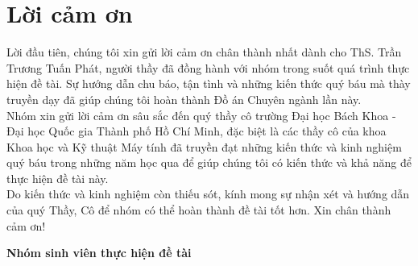 \section*{Lời cảm ơn}
\thispagestyle{empty}

\indent \indent Lời đầu tiên, chúng tôi xin gửi lời cảm ơn chân thành nhất dành cho ThS. Trần Trương Tuấn Phát, người thầy đã đồng hành với nhóm trong suốt quá trình thực hiện đề tài. Sự hướng dẫn chu báo, tận tình và những kiến thức quý báu mà thày truyền dạy đã giúp chúng tôi hoàn thành Đồ án Chuyên ngành lần này.
\\
\indent Nhóm xin gửi lời cảm ơn sâu sắc đến quý thầy cô trường Đại học Bách Khoa - Đại học Quốc gia Thành phố Hồ Chí Minh, đặc biệt là các thầy cô của khoa Khoa học và Kỹ thuật Máy tính đã truyền đạt những kiến thức và kinh nghiệm quý báu trong những năm học qua để giúp chúng tôi có kiến thức và khả năng để thực hiện đề tài này.
\\
\indent Do kiến thức và kinh nghiệm còn thiếu sót, kính mong sự nhận xét và hướng dẫn của quý Thầy, Cô để nhóm có thể hoàn thành đề tài tốt hơn. Xin chân thành cảm ơn!

\begin{flushright}
\textbf{Nhóm sinh viên thực hiện đề tài}
\end{flushright}

\clearpage
{}

